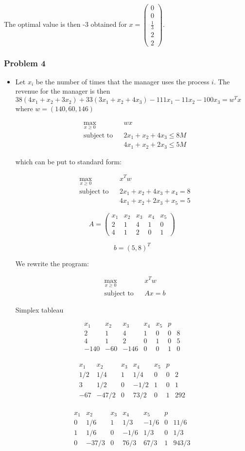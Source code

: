 \documentclass[12pt]{article}
\newcommand{\Q}[1]{\subsubsection*{Problem #1}}
\newcommand{\optimize}[4]
{
\begin{align*}
& \underset{#1}{\text{#4}}
& & #2 \\
& \text{subject to}
& & #3
\end{align*}
}
\newcommand{\maximize}[3]{\optimize{#1}{#2}{#3}{max}}
\newcommand{\Dir}[5]{
\left(
\begin{array}{c}
#1\\#2\\#3\\#4\\#5
\end{array} 
\right)
}
\begin{document}
The optimal value is then -3 obtained for $x = \Dir 0 0 {\frac{1}{3}} 2 2$.




\Q{4}

\begin{itemize}
\item 

  Let $x_i$ be the number of times that the manager uses the process $i$. The revenue for the manager is then $38 (4x_1 + x_2 + 3x_2) + 33(3x_1 + x_2 + 4x_3) - 111 x_1 - 11 x_2 - 100 x_3 = w^Tx$ where $w = (140, 60, 146)$


  \maximize{x \geq 0}{ w x}
    {2x_1 + x_2 + 4x_3 \leq 8M \\ &&& 4x_1 + x_2 + 2x_3 \leq 5M}
which can be put to standard form:
    \maximize{x \geq 0}{ x^Tw}
    {2x_1 + x_2 + 4x_3 + x_4 = 8 \\ &&& 4x_1 + x_2 + 2x_3 +x_5 = 5}
\[A = \left(
\begin{array}{r|r|r|r|r}
x_1&x_2&x_3&x_4&x_5\\
\hline
2&1&4&1&0\\
4&1&2&0&1
\end{array} 
\right) \]

$$b = (5, 8)^T$$

We rewrite the program:

    \maximize{x \geq 0}{  x^Tw}{Ax = b}

Simplex tableau

\[
\begin{array}{c|c|c|c|c|c|c|}
x_1 & x_2 & x_3 & x_4 & x_5 &p \\
2 & 1 & 4 & 1 & 0 & 0 & 8 \\
4 & 1 & 2 & 0 & 1 & 0 & 5 \\
-140 &  -60 & -146& 0 & 0 & 1 & 0 \\
\end{array}
\]

\[
\begin{array}{c|c|c|c|c|c|c|}
x_1 & x_2 & x_3 & x_4 & x_5 & p \\
1/2 & 1/4 & 1 & 1/4 &  0 & 0 & 2 \\
3 & 1/2& 0 & -1/2 &  1 & 0 & 1 \\ 
-67& -47/2 & 0 & 73/2 &  0 & 1 & 292    \\
\end{array}
\]


\[
\begin{array}{c|c|c|c|c|c|c|c}
x_1 & x_2 & x_3 & x_4 & x_5 & p \\
0 & 1/6 & 1 & 1/3  &  -1/6 &  0 & 11/6\\   
1 & 1/6 & 0 & -1/6 &  1/3 &   0 & 1/3  \\  
0 & -37/3 & 0 & 76/3 &  67/3 &  1 & 943/3  \\
\end{array}
\]



\end{itemize}
\end{document}
